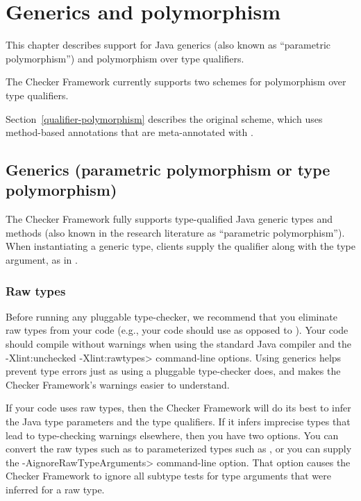 \htmlhr
\chapter{Generics and polymorphism\label{polymorphism}}

This chapter describes support for Java generics (also known as
``parametric polymorphism'') and polymorphism over type qualifiers.

The Checker Framework currently supports two schemes for polymorphism over
type qualifiers.

Section~\ref{qualifier-polymorphism} describes the
original scheme, which uses method-based annotations that are meta-annotated
with .

\section{Generics (parametric polymorphism or type polymorphism)\label{generics}}

The Checker Framework fully supports
type-qualified Java generic types and methods (also known in the research literature as ``parametric
polymorphism'').
When instantiating a generic type,
clients supply the qualifier along with the type argument, as in
.


\subsection{Raw types\label{generics-raw-types}}

Before running any pluggable type-checker, we recommend that you eliminate
raw types from your code (e.g., your code should use  as
opposed to ).
Your code should compile without warnings when using the standard Java
compiler and the \<-Xlint:unchecked -Xlint:rawtypes> command-line options.
Using generics helps prevent type errors just as using a pluggable
type-checker does, and makes the Checker Framework's warnings easier to
understand.

If your code uses raw types, then the Checker Framework will do its best to
infer the Java type parameters and the type qualifiers.  If it infers
imprecise types that lead to type-checking warnings elsewhere, then you have
two options.  You can convert the raw types such as  to
parameterized types such as , or you can supply the
\<-AignoreRawTypeArguments> command-line option.  That option causes the
Checker Framework to ignore all subtype tests for type arguments that
were inferred for a raw type.


